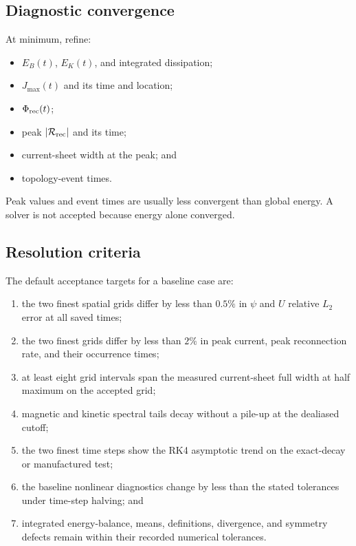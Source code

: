 \documentclass[11pt]{article}
\begin{document}
\subsection{Diagnostic convergence}

At minimum, refine:
\begin{itemize}
  \item $E_B(t)$, $E_K(t)$, and integrated dissipation;
  \item $J_{\max}(t)$ and its time and location;
  \item $\Phi_{\rm rec}(t)$;
  \item peak $|\mathcal R_{\rm rec}|$ and its time;
  \item current-sheet width at the peak; and
  \item topology-event times.
\end{itemize}
Peak values and event times are usually less convergent than global energy. A solver is not accepted because energy alone converged.

\subsection{Resolution criteria}

The default acceptance targets for a baseline case are:
\begin{enumerate}[label=\arabic*.]
  \item the two finest spatial grids differ by less than $0.5\%$ in $\psi$ and $U$ relative $L_2$ error at all saved times;
  \item the two finest grids differ by less than $2\%$ in peak current, peak reconnection rate, and their occurrence times;
  \item at least eight grid intervals span the measured current-sheet full width at half maximum on the accepted grid;
  \item magnetic and kinetic spectral tails decay without a pile-up at the dealiased cutoff;
  \item the two finest time steps show the RK4 asymptotic trend on the exact-decay or manufactured test;
  \item the baseline nonlinear diagnostics change by less than the stated tolerances under time-step halving; and
  \item integrated energy-balance, means, definitions, divergence, and symmetry defects remain within their recorded numerical tolerances.
\end{enumerate}
\end{document}
